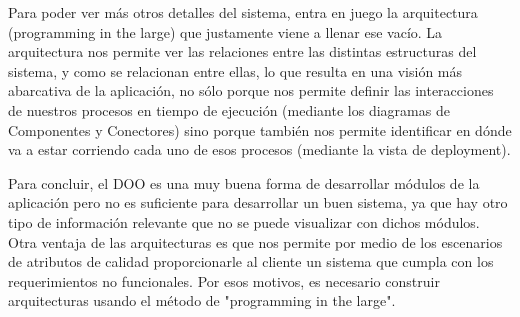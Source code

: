 \documentclass{article}
\theoremstyle{definition}
\theoremstyle{remark}
\begin{document}
Para poder ver más otros detalles del sistema, entra en juego la arquitectura (programming in the large) que justamente viene a llenar ese vacío. La arquitectura nos permite ver las relaciones entre las distintas estructuras del sistema, y como se relacionan entre ellas, lo que resulta en una visión más abarcativa de la aplicación, no sólo porque nos permite definir las interacciones de nuestros procesos en tiempo de ejecución (mediante los diagramas de Componentes y Conectores) sino porque también nos permite identificar en dónde va a estar corriendo cada uno de esos procesos (mediante la vista de deployment).

Para concluir, el DOO es una muy buena forma de desarrollar módulos de la aplicación pero no es suficiente para desarrollar un buen sistema, ya que hay otro tipo de información relevante que no se puede visualizar con dichos módulos. Otra ventaja de las arquitecturas es que nos permite por medio de los escenarios de atributos de calidad proporcionarle al cliente un sistema que cumpla con los requerimientos no funcionales. Por esos motivos, es necesario construir arquitecturas usando el método de "programming in the large".
\end{document}

